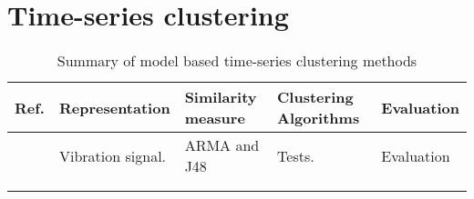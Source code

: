 \section{Time-series clustering}

\begin{longtable}{p{}p{}p{}p{}p{}}
    \hline
    Ref. & Representation & Similarity measure & Clustering Algorithms & Evaluation \\
    \hline 
    \hline
    \cite{ml_cm_wt_blade_ARMA_2018} & Vibration signal. & ARMA and J48 & Tests. & Evaluation \\ \hline
    \cite{cm_rnn_lstm} & & & & \\ \hline
    \hline
    \caption{Summary of model based time-series clustering methods}
    \label{tab:machine_learning_wt_cm_summary}
\end{longtable}